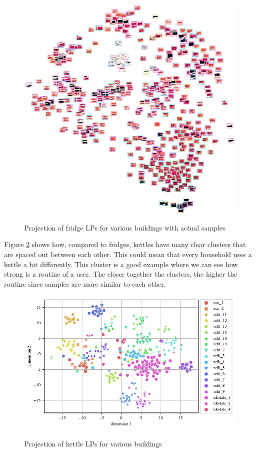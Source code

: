 \begin{figure}[H]
	\centering
	\caption{Projection of fridge LPs for various buildings with actual samples}
	\includegraphics[width=.9\textwidth]{Figures/TSNE/TSNE_per_appliance/img_scatter_refit_fridge_freeezer_fridge_freezer.png}
	\label{fig:tsne_pa_img_scatter_all_fridge}
\end{figure}

Figure \ref{fig:tsne_pa_scatter_all_kettle} shows how,
compared to fridges, kettles have many clear clusters that are spaced out between each other. 
This could mean that every household uses a kettle a bit differently.
This cluster is a good example where we can see how strong is a routine of a user.
The closer together the clusters, the higher the routine since samples are more similar to each other.

\begin{figure}[H]
	\centering
	\caption{Projection of kettle LPs for various buildings}
	\includegraphics[]{Figures/TSNE/TSNE_per_appliance/scatter_refit_kettle.pdf}
	\label{fig:tsne_pa_scatter_all_kettle}
\end{figure}

